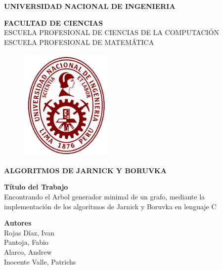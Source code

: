 \documentclass[a4paper]{article}
\begin{document}
\begin{titlepage}
\begin{center}
\vspace*{-0.4in}

{\fontsize{13}{30}\bf \selectfont UNIVERSIDAD NACIONAL DE INGENIERIA\\}

{\fontsize{13}{40}\bf \selectfont FACULTAD DE CIENCIAS\\}
\vspace*{0.15in} ESCUELA PROFESIONAL DE CIENCIAS DE LA COMPUTACI\'ON\\
\vspace*{0.04in}
\vspace*{0.15in} ESCUELA PROFESIONAL DE MATEM\'ATICA\\
\vspace*{0.1in}
\begin{figure}[htb]
\begin{center}
\includegraphics[width=4.5cm,height=5.5cm]{UNI.png}
\end{center}
\end{figure}
\begin{Large}
\textbf{ALGORITMOS DE JARNICK Y BORUVKA\\}
\end{Large}
\vspace*{0.2in}

\begin{large}
{\bf T\'itulo del Trabajo\\}
\vspace*{0.1in}
{\fontsize{13}{13}\selectfont 
Encontrando el Arbol generador minimal de un grafo, mediante la implementaci\'on de los algoritmos de Jarnick y Boruvka en lenguaje C\\}
\end{large}
\vspace*{0.1in}

\begin{large}
{\bf Autores} 
\vspace*{0.1in}
\\Rojas D\'iaz, Ivan\\
Pantoja, Fabio \\Alarco, Andrew\\
Inocente Valle, Patrichs
\end{large}


\end{center}
\end{titlepage}
\end{document}
